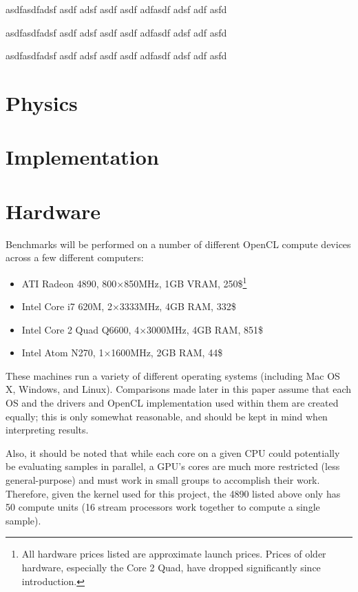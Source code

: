 \documentclass{acmsiggraph}
\begin{document}
asdfasdfadsf asdf adsf asdf asdf adfasdf adsf adf asfd

asdfasdfadsf asdf adsf asdf asdf adfasdf adsf adf asfd

asdfasdfadsf asdf adsf asdf asdf adfasdf adsf adf asfd

\section{Physics}

\section{Implementation}

\section{Hardware}

Benchmarks will be performed on a number of different OpenCL compute devices across a few different computers:

\begin{itemize}

\item ATI Radeon 4890, 800$\times$850MHz, 1GB VRAM, 250\$\footnote{All hardware prices listed are approximate launch prices. Prices of older hardware, especially the Core 2 Quad, have dropped significantly since introduction.\label{fn:prices}}

\item Intel Core i7 620M, 2$\times$3333MHz, 4GB RAM, 332\$

\item Intel Core 2 Quad Q6600, 4$\times$3000MHz, 4GB RAM, 851\$

\item Intel Atom N270, 1$\times$1600MHz, 2GB RAM, 44\$

\end{itemize}

These machines run a variety of different operating systems (including Mac OS X, Windows, and Linux). Comparisons made later in this paper assume that each OS and the drivers and OpenCL implementation used within them are created equally; this is only somewhat reasonable, and should be kept in mind when interpreting results.

Also, it should be noted that while each core on a given CPU could potentially be evaluating samples in parallel, a GPU's cores are much more restricted (less general-purpose) and must work in small groups to accomplish their work. Therefore, given the kernel used for this project, the 4890 listed above only has 50 compute units (16 stream processors work together to compute a single sample).
\end{document}
